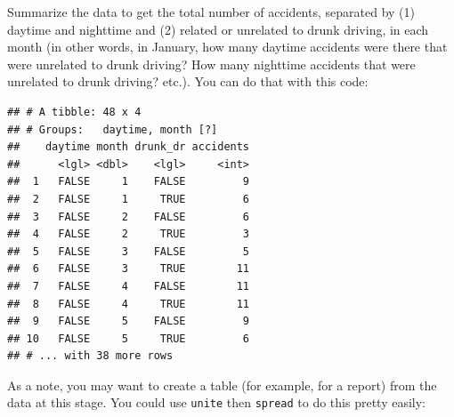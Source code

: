 \documentclass[]{book}
\makeatletter
\newenvironment{Shaded}{\begin{snugshade}}{\end{snugshade}}
\newcommand{\KeywordTok}[1]{\textcolor[rgb]{0.13,0.29,0.53}{\textbf{#1}}}
\newcommand{\DataTypeTok}[1]{\textcolor[rgb]{0.13,0.29,0.53}{#1}}
\newcommand{\StringTok}[1]{\textcolor[rgb]{0.31,0.60,0.02}{#1}}
\newcommand{\OperatorTok}[1]{\textcolor[rgb]{0.81,0.36,0.00}{\textbf{#1}}}
\newcommand{\NormalTok}[1]{#1}
\newenvironment{kframe}{%
\medskip{}
\setlength{\fboxsep}{.8em}
 \def\at@end@of@kframe{}%
 \ifinner\ifhmode%
  \def\at@end@of@kframe{\end{minipage}}%
  \begin{minipage}{\columnwidth}%
 \fi\fi%
 \def\FrameCommand##1{\hskip\@totalleftmargin \hskip-\fboxsep
 \colorbox{shadecolor}{##1}\hskip-\fboxsep
     \hskip-\linewidth \hskip-\@totalleftmargin \hskip\columnwidth}%
 \MakeFramed {\advance\hsize-\width
   \@totalleftmargin\z@ \linewidth\hsize
   \@setminipage}}%
 {\par\unskip\endMakeFramed%
 \at@end@of@kframe}
\renewenvironment{Shaded}{\begin{kframe}}{\end{kframe}}
\theoremstyle{definition}
\theoremstyle{definition}
\theoremstyle{definition}
\theoremstyle{remark}
\makeatother
\begin{document}
Summarize the data to get the total number of accidents, separated by
(1) daytime and nighttime and (2) related or unrelated to drunk driving,
in each month (in other words, in January, how many daytime accidents
were there that were unrelated to drunk driving? How many nighttime
accidents that were unrelated to drunk driving? etc.). You can do that
with this code:

\begin{Shaded}
\end{Shaded}

\begin{verbatim}
## # A tibble: 48 x 4
## # Groups:   daytime, month [?]
##    daytime month drunk_dr accidents
##      <lgl> <dbl>    <lgl>     <int>
##  1   FALSE     1    FALSE         9
##  2   FALSE     1     TRUE         6
##  3   FALSE     2    FALSE         6
##  4   FALSE     2     TRUE         3
##  5   FALSE     3    FALSE         5
##  6   FALSE     3     TRUE        11
##  7   FALSE     4    FALSE        11
##  8   FALSE     4     TRUE        11
##  9   FALSE     5    FALSE         9
## 10   FALSE     5     TRUE         6
## # ... with 38 more rows
\end{verbatim}

As a note, you may want to create a table (for example, for a report)
from the data at this stage. You could use \texttt{unite} then
\texttt{spread} to do this pretty easily:
\end{document}
